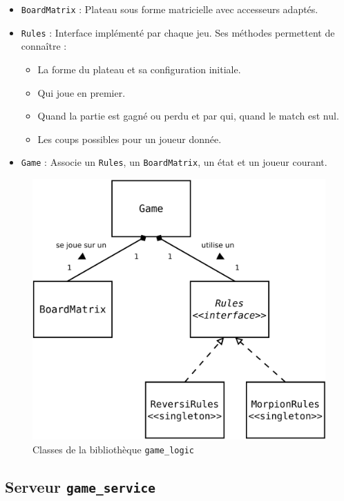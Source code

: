\begin{itemize}
\item \texttt{BoardMatrix} : Plateau sous forme matricielle avec accesseurs adaptés.
\item \texttt{Rules} : Interface implémenté par chaque jeu. Ses méthodes permettent de connaître :

\begin{itemize}
\item La forme du plateau et sa configuration initiale.
\item Qui joue en premier.
\item Quand la partie est gagné ou perdu et par qui, quand le match est nul.
\item Les coups possibles pour un joueur donnée.
\end{itemize}

\item \texttt{Game} : Associe un \texttt{Rules}, un \texttt{BoardMatrix}, un état et un joueur courant.
\end{itemize}

\begin{figure}[H] 
\centering
\includegraphics[width=\textwidth]{files/env/game_logic} 
\caption{Classes de la bibliothèque \texttt{game\_logic}} 
\label{game_logic}
\end{figure}


\subsection{Serveur \texttt{game\_service}}

